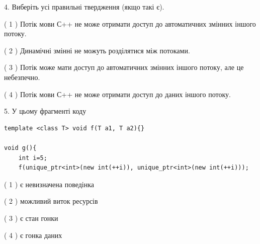 \documentclass[12pt, ukrainian]{article}
\begin{document}
\begin {large}
{%
4. Виберіть усі правильні твердження (якщо такі є).\par
\vspace{2mm}

( 1 ) Потік мови С++ не може отримати доступ до автоматичних змінних іншого потоку.%

( 2 ) Динамічні змінні не можуть розділятися між потоками.%

( 3 ) Потік може мати доступ до автоматичних змінних іншого потоку, але це небезпечно.%

( 4 ) Потік мови С++ не може отримати доступ до даних іншого потоку.%


5. У цьому фрагменті коду
\begin{verbatim}
template <class T> void f(T a1, T a2){}

void g(){
    int i=5;
    f(unique_ptr<int>(new int(++i)), unique_ptr<int>(new int(++i)));
\end{verbatim}

( 1 ) є невизначена поведінка%

( 2 ) можливий виток ресурсів%

( 3 ) є стан гонки%

( 4 ) є гонка даних%
}
\end {large}
\end{document}
